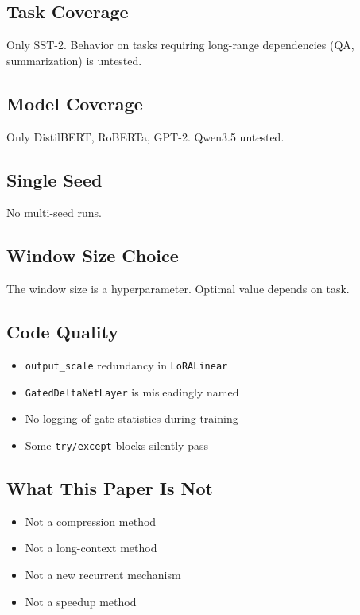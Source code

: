 \subsection{Task Coverage}

Only SST-2. Behavior on tasks requiring long-range dependencies (QA, 
summarization) is untested.

\subsection{Model Coverage}

Only DistilBERT, RoBERTa, GPT-2. Qwen3.5 untested.

\subsection{Single Seed}

No multi-seed runs.

\subsection{Window Size Choice}

The window size is a hyperparameter. Optimal value depends on task.

\subsection{Code Quality}

\begin{itemize}
\item \texttt{output\_scale} redundancy in \texttt{LoRALinear}
\item \texttt{GatedDeltaNetLayer} is misleadingly named
\item No logging of gate statistics during training
\item Some \texttt{try/except} blocks silently pass

\end{itemize}
\subsection{What This Paper Is Not}

\begin{itemize}
\item Not a compression method
\item Not a long-context method
\item Not a new recurrent mechanism
\item Not a speedup method

\end{itemize}
